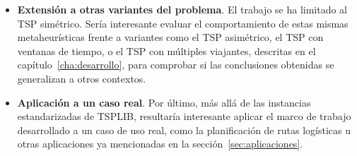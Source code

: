 \begin{itemize}
  \item \textbf{Extensión a otras variantes del problema}. El trabajo se ha limitado al TSP simétrico. Sería interesante
  evaluar el comportamiento de estas mismas metaheurísticas frente a variantes como el TSP asimétrico, el TSP con ventanas
  de tiempo, o el TSP con múltiples viajantes, descritas en el capítulo~\ref{cha:desarrollo}, para comprobar si las
  conclusiones obtenidas se generalizan a otros contextos.

  \item \textbf{Aplicación a un caso real}. Por último, más allá de las instancias estandarizadas de TSPLIB, resultaría
  interesante aplicar el marco de trabajo desarrollado a un caso de uso real, como la planificación de rutas logísticas u otras
  aplicaciones ya mencionadas en la sección~\ref{sec:aplicaciones}.
\end{itemize}



